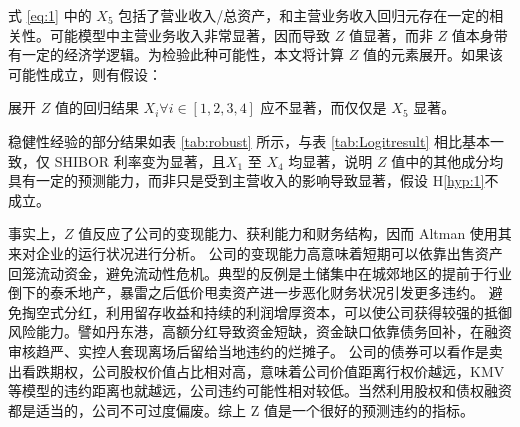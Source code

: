 式 \ref{eq:1} 中的 \(X_{5}\) 包括了营业收入/总资产，和主营业务收入回归元存在一定的相关性。可能模型中主营业务收入非常显著，因而导致 \(Z\) 值显著，而非 \(Z\) 值本身带有一定的经济学逻辑。为检验此种可能性，本文将计算 \(Z\) 值的元素展开。如果该可能性成立，则有假设：

\begin{hyp}
	\label{hyp:1}
	展开 \(Z\) 值的回归结果 \(X_i\forall i\in [1,2,3,4] \) 应不显著，而仅仅是 \(X_5\) 显著。
\end{hyp}


稳健性经验的部分结果如表
\ref{tab:robust}
所示，与表 \ref{tab:Logitresult} 相比基本一致，仅 SHIBOR 利率变为显著，且\(X_1\) 至 \(X_4\) 均显著，说明 \(Z\) 值中的其他成分均具有一定的预测能力，而非只是受到主营收入的影响导致显著，假设 H\ref{hyp:1}不成立。

事实上，\(Z\) 值反应了公司的变现能力、获利能力和财务结构，因而 Altman 使用其来对企业的运行状况进行分析。
公司的变现能力高意味着短期可以依靠出售资产回笼流动资金，避免流动性危机。典型的反例是土储集中在城郊地区的提前于行业倒下的泰禾地产，暴雷之后低价甩卖资产进一步恶化财务状况引发更多违约。
避免掏空式分红，利用留存收益和持续的利润增厚资本，可以使公司获得较强的抵御风险能力。譬如丹东港，高额分红导致资金短缺，资金缺口依靠债务回补，在融资审核趋严、实控人套现离场后留给当地违约的烂摊子。
公司的债券可以看作是卖出看跌期权，公司股权价值占比相对高，意味着公司价值距离行权价越远，KMV 等模型的违约距离也就越远，公司违约可能性相对较低。当然利用股权和债权融资都是适当的，公司不可过度偏废。综上 Z 值是一个很好的预测违约的指标。
